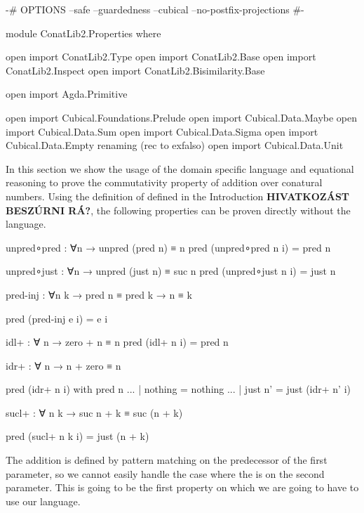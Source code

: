 \begin{code}[hide]
{-# OPTIONS --safe --guardedness --cubical --no-postfix-projections #-}

module ConatLib2.Properties where

open import ConatLib2.Type
open import ConatLib2.Base
open import ConatLib2.Inspect
open import ConatLib2.Bisimilarity.Base

open import Agda.Primitive

open import Cubical.Foundations.Prelude
open import Cubical.Data.Maybe
open import Cubical.Data.Sum
open import Cubical.Data.Sigma
open import Cubical.Data.Empty
  renaming (rec to exfalso)
open import Cubical.Data.Unit
\end{code}

In this section we show the usage of the domain specific language and
equational reasoning to prove the commutativity property of addition
over conatural numbers. Using the definition of \AgdaFunction{\_+\_}
defined in the Introduction \textbf{HIVATKOZÁST BESZÚRNI RÁ?}, the following properties can be proven
directly without the language.

\begin{code}[hide]
unpred∘pred : ∀{n} → unpred (pred n) ≡ n
pred (unpred∘pred {n} i) = pred n

unpred∘just : ∀{n} → unpred (just n) ≡ suc n
pred (unpred∘just {n} i) = just n
\end{code}
\begin{code}
pred-inj : ∀{n k} → pred n ≡ pred k → n ≡ k
\end{code}
\begin{code}[hide]
pred (pred-inj e i) = e i
\end{code}
\begin{code}[hide]
idl+ : ∀ n → zero + n ≡ n
pred (idl+ n i) = pred n
\end{code}
\begin{code}
idr+ : ∀ n → n + zero ≡ n
\end{code}
\begin{code}[hide]
pred (idr+ n i) with pred n
... | nothing = nothing
... | just n' = just (idr+ n' i)
\end{code}
\begin{code}
sucl+ : ∀ n k → suc n + k ≡ suc (n + k)
\end{code}
\begin{code}[hide]
pred (sucl+ n k i) = just (n + k)
\end{code}

The addition is defined by pattern matching on the predecessor of the
first parameter, so we cannot easily handle the case where the 
is on the second parameter. This is going to be the first property on which
we are going to have to use our language.

